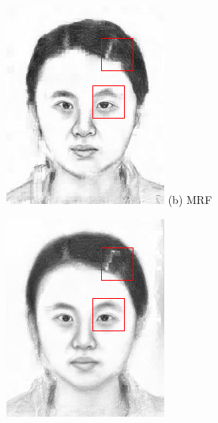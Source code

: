 \documentclass[10pt,twocolumn,letterpaper]{article}
\begin{document}
\begin{figure}[t]
\begin{minipage}[t]{0.24\linewidth}
\includegraphics[width=1\linewidth]{img/example_mrf.png}
(b) MRF\cite{wang2009face}
\end{minipage}
\begin{minipage}[t]{0.24\linewidth}
\centering
\includegraphics[width=1\linewidth]{img/example_wmrf.png}

\end{minipage}
\end{figure}
\end{document}
